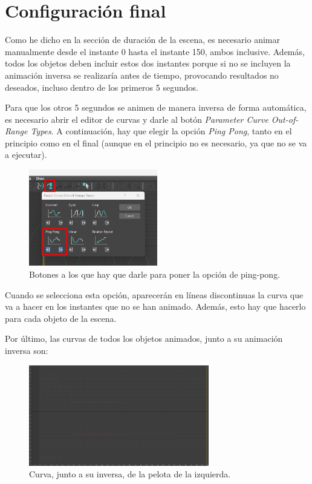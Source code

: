 \section{Configuración final}

Como he dicho en la sección de duración de la escena, es necesario animar manualmente desde el instante 0 hasta el instante 150, ambos inclusive. Además, todos los objetos deben incluir estos dos instantes porque si no se incluyen la animación inversa se realizaría antes de tiempo, provocando resultados no deseados, incluso dentro de los primeros 5 segundos.

\bigskip

Para que los otros 5 segundos se animen de manera inversa de forma automática, es necesario abrir el editor de curvas y darle al botón \textit{Parameter Curve Out-of-Range Types}. A continuación, hay que elegir la opción \textit{Ping Pong}, tanto en el principio como en el final (aunque en el principio no es necesario, ya que no se va a ejecutar).

\begin{figure}[H]
   \centering
   \includegraphics[width=0.5\textwidth]{imagenes/misc/ping-pong.png}
   \caption{Botones a los que hay que darle para poner la opción de ping-pong.}
\end{figure}

Cuando se selecciona esta opción, aparecerán en líneas discontinuas la curva que va a hacer en los instantes que no se han animado. Además, esto hay que hacerlo para cada objeto de la escena.

\bigskip

Por último, las curvas de todos los objetos animados, junto a su animación inversa son:

\begin{figure}[H]
   \centering
   \includegraphics[width=0.7\textwidth]{imagenes/curvas finales/PL.png}
   \caption{Curva, junto a su inversa, de la pelota de la izquierda.}
\end{figure}

